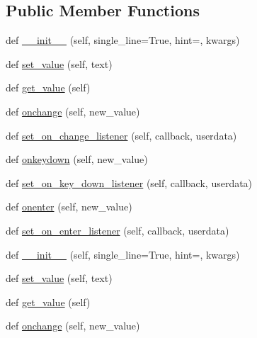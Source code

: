 \subsection*{Public Member Functions}
\begin{DoxyCompactItemize}
\item 
def \hyperlink{classremi_1_1gui_1_1TextInput_a6809e1548e1e0a04474a0187addaebae}{\+\_\+\+\_\+init\+\_\+\+\_\+} (self, single\+\_\+line=True, hint=\textquotesingle{}\textquotesingle{}, kwargs)
\item 
def \hyperlink{classremi_1_1gui_1_1TextInput_a4577e9b6041238084174dc2b7652ae9d}{set\+\_\+value} (self, text)
\item 
def \hyperlink{classremi_1_1gui_1_1TextInput_aa3e855f8c7fc6dac558512f74239f916}{get\+\_\+value} (self)
\item 
def \hyperlink{classremi_1_1gui_1_1TextInput_a5f0e6842581f0413dffbd40602bd27ac}{onchange} (self, new\+\_\+value)
\item 
def \hyperlink{classremi_1_1gui_1_1TextInput_ae56b8863f62b143cd27cc450bfa1076a}{set\+\_\+on\+\_\+change\+\_\+listener} (self, callback, userdata)
\item 
def \hyperlink{classremi_1_1gui_1_1TextInput_ae7f4eb4993fb8ce37215426dbde3534a}{onkeydown} (self, new\+\_\+value)
\item 
def \hyperlink{classremi_1_1gui_1_1TextInput_aaa9b351150b3c23b85592355be5a8203}{set\+\_\+on\+\_\+key\+\_\+down\+\_\+listener} (self, callback, userdata)
\item 
def \hyperlink{classremi_1_1gui_1_1TextInput_a5da6d7161c97ea9e47fd8b1a49e3cd0f}{onenter} (self, new\+\_\+value)
\item 
def \hyperlink{classremi_1_1gui_1_1TextInput_ab76a0a03c9f12a4e0ae4112ec7f799ff}{set\+\_\+on\+\_\+enter\+\_\+listener} (self, callback, userdata)
\item 
def \hyperlink{classremi_1_1gui_1_1TextInput_a6809e1548e1e0a04474a0187addaebae}{\+\_\+\+\_\+init\+\_\+\+\_\+} (self, single\+\_\+line=True, hint=\textquotesingle{}\textquotesingle{}, kwargs)
\item 
def \hyperlink{classremi_1_1gui_1_1TextInput_a4577e9b6041238084174dc2b7652ae9d}{set\+\_\+value} (self, text)
\item 
def \hyperlink{classremi_1_1gui_1_1TextInput_aa3e855f8c7fc6dac558512f74239f916}{get\+\_\+value} (self)
\item 
def \hyperlink{classremi_1_1gui_1_1TextInput_a5f0e6842581f0413dffbd40602bd27ac}{onchange} (self, new\+\_\+value)
\item 

\end{DoxyCompactItemize}

